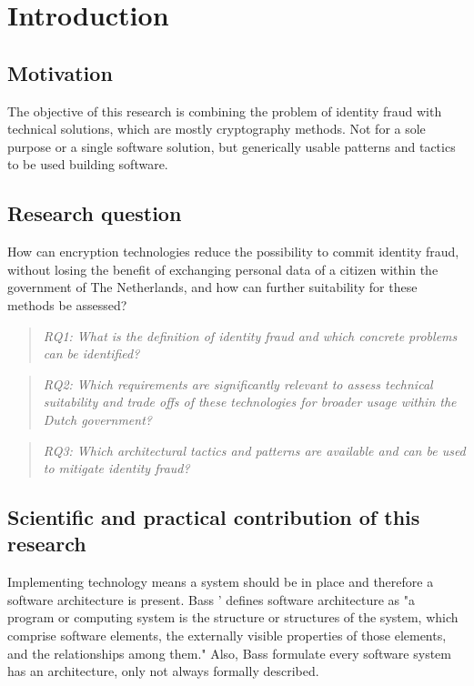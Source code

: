 \chapter{Introduction}\label{s:intro}


\section{Motivation}
The objective of this research is combining the problem of identity fraud with technical solutions, which are mostly cryptography methods. Not for a sole purpose or a single software solution, but generically usable patterns and tactics to be used building software.

\section{Research question}
How can encryption technologies reduce the possibility to commit identity fraud, without losing the benefit of exchanging personal data of a citizen within the government of The Netherlands, and how can further suitability for these methods be assessed?

\begin{quote}\emph{RQ1: What is the definition of identity fraud and which concrete problems can be identified?}\end{quote}
\begin{quote}\emph{RQ2: Which requirements are significantly relevant to assess technical suitability and trade offs of these technologies for broader usage within the Dutch government?}\end{quote}
\begin{quote}\emph{RQ3: Which architectural tactics and patterns are available and can be used to mitigate identity fraud?}\end{quote}

\section{Scientific and practical contribution of this research}
Implementing technology means a system should be in place and therefore a software architecture is present. Bass '\etal \cite{Bass2015SoftwareAI} defines software architecture as "a program or computing system is the structure or structures of the system, which comprise software elements, the externally visible properties of those elements, and the relationships among them." Also, Bass \etal formulate every software system has an architecture, only not always formally described.

